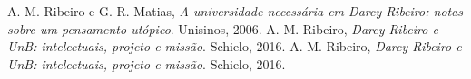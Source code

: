 \documentclass{sbrt}
\begin{document}
\begin{thebibliography}{99}
 A. M. Ribeiro e G. R. Matias, \textit{A universidade necessária em Darcy Ribeiro: notas sobre  um pensamento utópico}. Unisinos, 2006.
 A. M. Ribeiro, \textit{Darcy Ribeiro e UnB: intelectuais, projeto e missão}. Schielo, 2016.
 A. M. Ribeiro, \textit{Darcy Ribeiro e UnB: intelectuais, projeto e missão}. Schielo, 2016.
\end{thebibliography}
\end{document}
